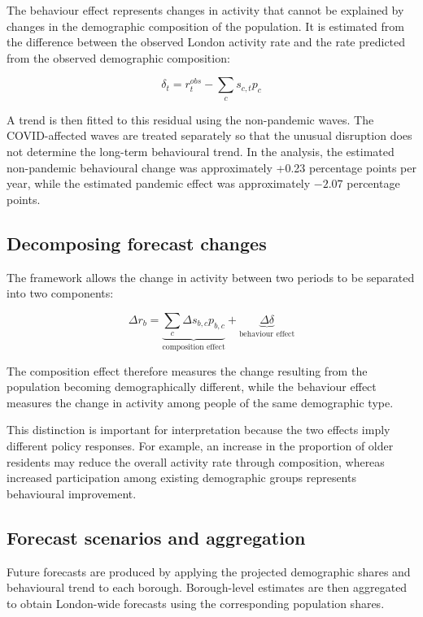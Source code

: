 \documentclass[ %
                    author={Ashrey Ashrey, Sanya Kapoor, Trisha Sharma, Yash Bhooshan Pandloskar},
                supervisor={Dr. Dalila O’Grady},
                    degree={MSc},
                     title={Using machine learning to forecast physical activity participation, volunteering and activity patterns in London},
                  subtitle={},
                      type={},
                      year={2021}]{dissertation}
\begin{document}
\noindent
The behaviour effect represents changes in activity that cannot be explained by changes in the demographic composition of the population. It is estimated from the difference between the observed London activity rate and the rate predicted from the observed demographic composition:

\[
\delta_t
=
r_t^{obs}
-
\sum_c s_{c,t}p_c
\]

A trend is then fitted to this residual using the non-pandemic waves. The COVID-affected waves are treated separately so that the unusual disruption does not determine the long-term behavioural trend. In the analysis, the estimated non-pandemic behavioural change was approximately +0.23 percentage points per year, while the estimated pandemic effect was approximately $-2.07$ percentage points.

\FloatBarrier
\subsection{Decomposing forecast changes}

\noindent
The framework allows the change in activity between two periods to be separated into two components:

\[
\Delta r_b
=
\underbrace{
\sum_c \Delta s_{b,c}p_{b,c}
}_{\text{composition effect}}
+
\underbrace{
\Delta\delta
}_{\text{behaviour effect}}
\]

The composition effect therefore measures the change resulting from the population becoming demographically different, while the behaviour effect measures the change in activity among people of the same demographic type.

This distinction is important for interpretation because the two effects imply different policy responses. For example, an increase in the proportion of older residents may reduce the overall activity rate through composition, whereas increased participation among existing demographic groups represents behavioural improvement.

\FloatBarrier
\subsection{Forecast scenarios and aggregation}

\noindent
Future forecasts are produced by applying the projected demographic shares and behavioural trend to each borough. Borough-level estimates are then aggregated to obtain London-wide forecasts using the corresponding population shares.
\end{document}
